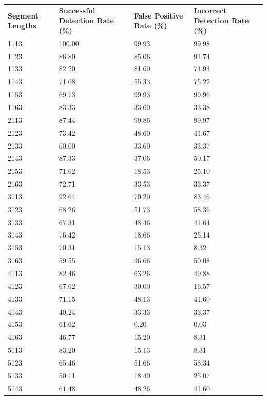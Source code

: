 \begin{appendices}
\begin{longtable}{|p{1.5in}|p{1in}|p{1in}|p{1in}|}
	\hline
	\textbf{Segment Lengths} & \textbf{Successful Detection Rate (\%)} & \textbf{False Positive Rate (\%)} & \textbf{Incorrect Detection Rate (\%)}  \\
	\hhline{|=|=|=|=|}
	1113 & 100.00 &  99.93 &  99.98 \\ \hline
	1123 &  86.80 &  85.06 &  91.74 \\ \hline
	1133 &  82.20 &  81.60 &  74.93 \\ \hline
	1143 &  71.08 &  55.33 &  75.22 \\ \hline
	1153 &  69.73 &  99.93 &  99.96 \\ \hline
	1163 &  83.33 &  33.60 &  33.38 \\ \hline
	2113 &  87.44 &  99.86 &  99.97 \\ \hline
	2123 &  73.42 &  48.60 &  41.67 \\ \hline
	2133 &  60.00 &  33.60 &  33.37 \\ \hline
	2143 &  87.33 &  37.06 &  50.17 \\ \hline
	2153 &  71.62 &  18.53 &  25.10 \\ \hline
	2163 &  72.71 &  33.53 &  33.37 \\ \hline
	3113 &  92.64 &  70.20 &  83.46 \\ \hline
	3123 &  68.26 &  51.73 &  58.36 \\ \hline
	3133 &  67.31 &  48.46 &  41.64 \\ \hline
	3143 &  76.42 &  18.66 &  25.14 \\ \hline
	3153 &  70.31 &  15.13 &   8.32 \\ \hline
	3163 &  59.55 &  36.66 &  50.08 \\ \hline
	4113 &  82.46 &  63.26 &  49.88 \\ \hline
	4123 &  67.62 &  30.00 &  16.57 \\ \hline
	4133 &  71.15 &  48.13 &  41.60 \\ \hline
	4143 &  40.24 &  33.33 &  33.37 \\ \hline
	4153 &  61.62 &   0.20 &   0.03 \\ \hline
	4163 &  46.77 &  15.20 &   8.31 \\ \hline
	5113 &  83.20 &  15.13 &   8.31 \\ \hline
	5123 &  65.46 &  51.66 &  58.34 \\ \hline
	5133 &  50.11 &  18.40 &  25.07 \\ \hline
	5143 &  61.48 &  48.26 &  41.60 \\ \hline

\end{longtable}
\end{appendices}
